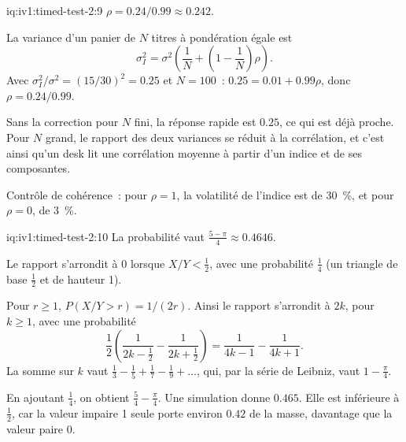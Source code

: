 \begin{solution}{iq:iv1:timed-test-2:9}
$\rho = 0.24/0.99 \approx 0.242$.

La variance d'un panier de $N$ titres à pondération égale est
\[
\sigma_I^2 = \sigma^2\left(\frac1N + \left(1 - \frac1N\right)\rho\right).
\]
Avec $\sigma_I^2/\sigma^2 = (15/30)^2 = 0.25$ et $N = 100$~: $0.25 = 0.01 + 0.99\rho$, donc $\rho = 0.24/0.99$.

Sans la correction pour $N$ fini, la réponse rapide est $0.25$, ce qui est déjà proche. Pour $N$ grand, le rapport des deux variances se réduit à la corrélation, et c'est ainsi qu'un desk lit une corrélation moyenne à partir d'un indice et de ses composantes.

Contrôle de cohérence~: pour $\rho = 1$, la volatilité de l'indice est de 30~\%, et pour $\rho = 0$, de 3~\%.

\end{solution}

\begin{solution}{iq:iv1:timed-test-2:10}
La probabilité vaut $\frac{5 - \pi}{4} \approx 0.4646$.

Le rapport s'arrondit à 0 lorsque $X/Y < \frac12$, avec une probabilité $\frac14$ (un triangle de base $\frac12$ et de hauteur 1).

Pour $r \ge 1$, $P(X/Y > r) = 1/(2r)$. Ainsi le rapport s'arrondit à $2k$, pour $k \ge 1$, avec une probabilité
\[
\frac12\left(\frac{1}{2k - \frac12} - \frac{1}{2k + \frac12}\right) = \frac{1}{4k - 1} - \frac{1}{4k + 1}.
\]
La somme sur $k$ vaut $\frac13 - \frac15 + \frac17 - \frac19 + \dots$, qui, par la série de Leibniz, vaut $1 - \frac{\pi}{4}$.

En ajoutant $\frac14$, on obtient $\frac54 - \frac{\pi}{4}$. Une simulation donne $0.465$. Elle est inférieure à $\frac12$, car la valeur impaire 1 seule porte environ $0.42$ de la masse, davantage que la valeur paire 0.

\end{solution}

